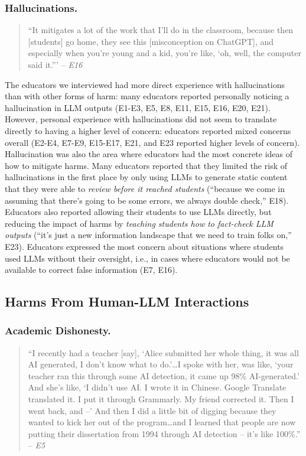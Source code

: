 \subsubsection*{Hallucinations.}
\begin{quote}
    ``It mitigates a lot of the work that I'll do in the classroom, because then [students] go home, they see this [misconception on ChatGPT], and especially when you're young and a kid, you're like, ‘oh, well, the computer said it.''' -- \textit{E16}
\end{quote}

\noindent The educators we interviewed had more direct experience with hallucinations than with other forms of harm: many educators reported personally noticing a hallucination in LLM outputs (E1-E3, E5, E8, E11, E15, E16, E20, E21). However, personal experience with hallucinations did not seem to translate directly to having a higher level of concern: educators reported mixed concerns overall (E2-E4, E7-E9, E15-E17, E21, and E23 reported higher levels of concern). Hallucination was also the area where educators had the most concrete ideas of how to mitigate harms. Many educators reported that they limited the risk of hallucinations in the first place by only using LLMs to generate static content that they were able to \textit{review before it reached students} (``because we come in assuming that there's going to be some errors, we always double check,'' E18). Educators also reported allowing their students to use LLMs directly, but reducing the impact of harms by \textit{teaching students how to fact-check LLM outputs} (``it's just a new information landscape that we need to train folks on,'' E23). Educators expressed the most concern about situations where students used LLMs without their oversight, i.e., in cases where educators would not be available to correct false information (E7, E16).

\subsection{Harms From Human-LLM Interactions}\label{s-results-interaction-harms-educators}

\subsubsection*{Academic Dishonesty.}

\begin{quote}
    ``I recently had a teacher [say], `Alice submitted her whole thing, it was all AI generated, I don't know what to do.'\ldots I spoke with her, was like, `your teacher ran this through some AI detection, it came up 98\% AI-generated.' And she's like, `I didn't use AI. I wrote it in Chinese. Google Translate translated it. I put it through Grammarly. My friend corrected it. Then I went back, and --' And then I did a little bit of digging because they wanted to kick her out of the program\ldots and I learned that people are now putting their dissertation from 1994 through AI detection -- it’s like 100\%.'' -- \textit{E5}
\end{quote}

